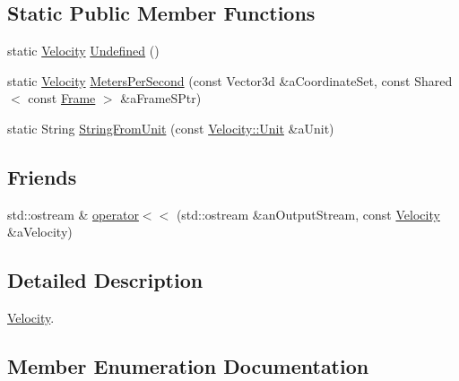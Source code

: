 \subsection*{Static Public Member Functions}
\begin{DoxyCompactItemize}
\item 
static \hyperlink{classostk_1_1physics_1_1coord_1_1_velocity}{Velocity} \hyperlink{classostk_1_1physics_1_1coord_1_1_velocity_a3eb51fc62403ba59256b5b0a816a6392}{Undefined} ()
\item 
static \hyperlink{classostk_1_1physics_1_1coord_1_1_velocity}{Velocity} \hyperlink{classostk_1_1physics_1_1coord_1_1_velocity_a9c21dc239f2109c9698ac752b3d395b7}{Meters\+Per\+Second} (const Vector3d \&a\+Coordinate\+Set, const Shared$<$ const \hyperlink{classostk_1_1physics_1_1coord_1_1_frame}{Frame} $>$ \&a\+Frame\+S\+Ptr)
\item 
static String \hyperlink{classostk_1_1physics_1_1coord_1_1_velocity_a9a016d320278b1de234fa5dc2c96370d}{String\+From\+Unit} (const \hyperlink{classostk_1_1physics_1_1coord_1_1_velocity_a01701e56094328a31d0211da5ac1ba28}{Velocity\+::\+Unit} \&a\+Unit)
\end{DoxyCompactItemize}
\subsection*{Friends}
\begin{DoxyCompactItemize}
\item 
std\+::ostream \& \hyperlink{classostk_1_1physics_1_1coord_1_1_velocity_ab3987a176df736aa7fa50aa763ed068b}{operator$<$$<$} (std\+::ostream \&an\+Output\+Stream, const \hyperlink{classostk_1_1physics_1_1coord_1_1_velocity}{Velocity} \&a\+Velocity)
\end{DoxyCompactItemize}


\subsection{Detailed Description}
\hyperlink{classostk_1_1physics_1_1coord_1_1_velocity}{Velocity}. 

\subsection{Member Enumeration Documentation}
\mbox{\label{classostk_1_1physics_1_1coord_1_1_velocity_a01701e56094328a31d0211da5ac1ba28}} 
